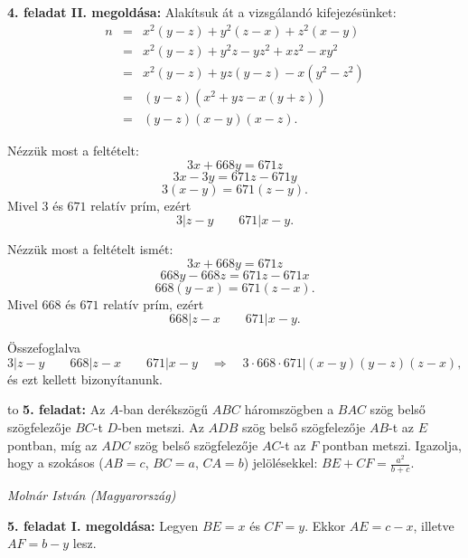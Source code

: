 \documentclass[a4paper,10pt]{article}
\def\ki#1#2{\hfill {\it #1 (#2)}\medskip}
\begin{document}
{\bf 4. feladat II. megoldása: }
Alakítsuk át a vizsgálandó kifejezésünket:
\begin{eqnarray*}
n &=& x^2(y-z)+y^2(z-x)+z^2(x-y) \\ 
&=& x^2(y-z)+y^2z-yz^2+xz^2-xy^2 \\
&=& x^2(y-z)+yz(y-z)-x\left(y^2-z^2\right) \\
&=& (y-z)\left(x^2+yz-x(y+z)\right) \\
&=& (y-z)(x-y)(x-z). 
\end{eqnarray*}

Nézzük most a feltételt:
$$3x+668y=671z$$
$$3x-3y=671z-671y$$
$$3(x-y)=671(z-y).$$
Mivel $3$ és $671$ relatív prím, ezért 
$$3|z-y \qquad 671|x-y.$$

Nézzük most a feltételt ismét:
$$3x+668y=671z$$
$$668y-668z=671z-671x$$
$$668(y-x)=671(z-x).$$
Mivel $668$ és $671$ relatív prím, ezért
$$668|z-x \qquad 671|x-y.$$

Összefoglalva
$$3|z-y \qquad 668|z-x \qquad 671|x-y \quad \Rightarrow \quad 3\cdot 668\cdot 671|(x-y)(y-z)(z-x),$$
és ezt kellett bizonyítanunk.
\medskip


\hbox to 
{\bf 5. feladat: }
Az $A$-ban derékszögű $ABC$ háromszögben a $BAC$ szög belső szögfelezője $BC$-t $D$-ben metszi. Az $ADB$ szög belső szögfelezője $AB$-t az $E$ pontban, míg az $ADC$ szög belső szögfelezője $AC$-t az $F$ pontban metszi.
Igazolja, hogy a szokásos ($AB = c$, $BC = a$, $CA= b$) jelölésekkel: $BE+CF=\frac{a^2}{b+c}$.

\ki{Molnár István}{Magyarország}\medskip

{\bf 5. feladat I. megoldása: }
Legyen $BE=x$ és $CF=y$. Ekkor $AE=c-x$, illetve $AF=b-y$ lesz.
\end{document}

